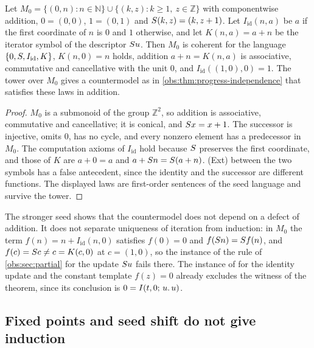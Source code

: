 \begin{proposition}
\label{obs:prop:pi-cancellative}
Let
$M_0=\{(0,n):n\in\mathbb{N}\}\cup\{(k,z):k\ge 1,\ z\in\mathbb{Z}\}$ with
componentwise addition, $0=(0,0)$, $1=(0,1)$ and $S(k,z)=(k,z+1)$. Let
$I_{\mathrm{id}}(n,a)$ be $a$ if the first coordinate of $n$ is $0$ and $1$
otherwise, and let $K(n,a)=a+n$ be the iterator symbol of the descriptor
$S u$. Then $M_0$ is coherent for the language
$\{0,S,I_{\mathrm{id}},K\}$, $K(n,0)=n$ holds, addition $a+n=K(n,a)$ is
associative, commutative and cancellative with the unit $0$, and
$I_{\mathrm{id}}((1,0),0)=1$. The tower over $M_0$ gives a countermodel as in
\cref{obs:thm:progress-independence} that satisfies these laws in addition.
\end{proposition}

\begin{proof}
$M_0$ is a submonoid of the group $\mathbb{Z}^2$, so addition is associative,
commutative and cancellative; it is conical, and $S x=x+1$. The successor is
injective, omits $0$, has no cycle, and every nonzero element has a
predecessor in $M_0$. The computation axioms of $I_{\mathrm{id}}$ hold because
$S$ preserves the first coordinate, and those of $K$ are $a+0=a$ and
$a+S n=S(a+n)$. (Ext) between the two symbols has a false antecedent,
since the identity and the successor are different functions. The displayed
laws are first-order sentences of the seed language and survive the tower.
\end{proof}

The stronger seed shows that the countermodel does not depend on a defect of
addition. It does not separate uniqueness of iteration from induction: in
$M_0$ the term $f(n)=n+I_{\mathrm{id}}(n,0)$ satisfies $f(0)=0$ and
$f(S n)=S f(n)$, and $f(c)=S c\ne c=K(c,0)$ at $c=(1,0)$, so the
instance of the rule  of \cref{obs:sec:partial} for the update
$S u$ fails there. The instance of  for the identity update
and the constant template $f(z)=0$ already excludes the witness of the theorem,
since its conclusion is $0=I(t,0;\,u.\,u)$.

\subsection{Fixed points and seed shift do not give induction}
\label{obs:sec:fixed-points}

